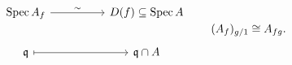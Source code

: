 \[
\begin{tikzcd}[column sep=huge]
\Spec A_f \arrow[r,"\sim"] & D(f)\subseteq\Spec A\\
\mfq \arrow[r,mapsto] & \mfq\cap A
\end{tikzcd}
\qquad
(A_f)_{g/1}\cong A_{fg}.
\]
